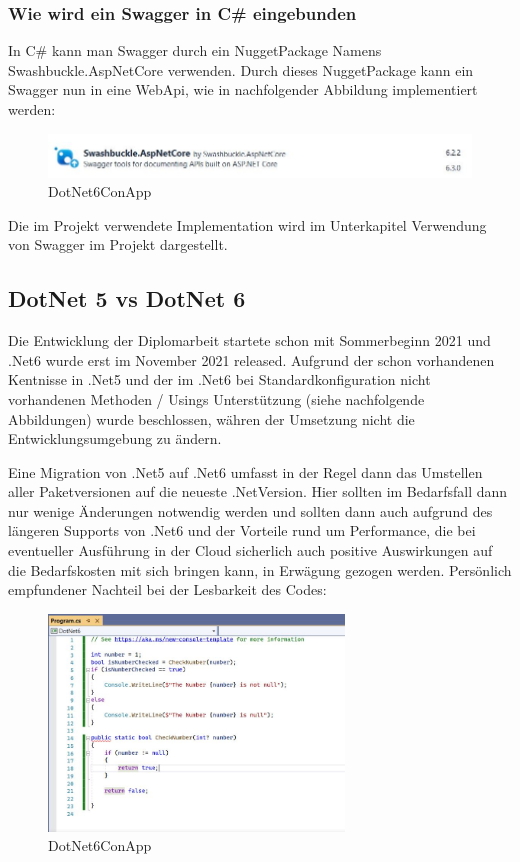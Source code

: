 \subsubsection*{Wie wird ein Swagger in C\# eingebunden}
In C\# kann man Swagger durch ein NuggetPackage Namens Swashbuckle.AspNetCore verwenden.
Durch dieses NuggetPackage kann ein Swagger nun in eine WebApi, wie in nachfolgender Abbildung implementiert werden:


\begin{figure}[H]
    \centering
    \includegraphics[width=1\textwidth]{./pics/SwaggerNuggetPackage.JPG}
    \caption{DotNet6ConApp}
\end{figure}


Die im Projekt verwendete Implementation wird im Unterkapitel Verwendung von Swagger im Projekt dargestellt.


\subsection {DotNet 5 vs DotNet 6}

Die Entwicklung der Diplomarbeit startete schon mit Sommerbeginn 2021 und .Net6 wurde erst im November 2021 released. 
Aufgrund der schon vorhandenen Kentnisse in .Net5 und der im .Net6 bei Standardkonfiguration nicht vorhandenen Methoden / Usings Unterstützung (siehe nachfolgende Abbildungen)
wurde beschlossen, währen der Umsetzung nicht die Entwicklungsumgebung zu ändern.

Eine Migration von .Net5 auf .Net6 umfasst in der Regel dann das Umstellen aller Paketversionen auf die neueste .NetVersion.
Hier sollten im Bedarfsfall dann nur wenige Änderungen notwendig werden und sollten dann auch aufgrund des längeren Supports von .Net6 
und der Vorteile rund um Performance, die bei eventueller Ausführung in der Cloud sicherlich auch positive Auswirkungen auf die 
Bedarfskosten mit sich bringen kann, in Erwägung gezogen werden.
Persönlich empfundener Nachteil bei der Lesbarkeit des Codes:

\begin{figure}[H]
    \centering
    \includegraphics[width=0.7\textwidth]{./pics/DotNet6ConApp.JPG}
    \caption{DotNet6ConApp}
\end{figure}


